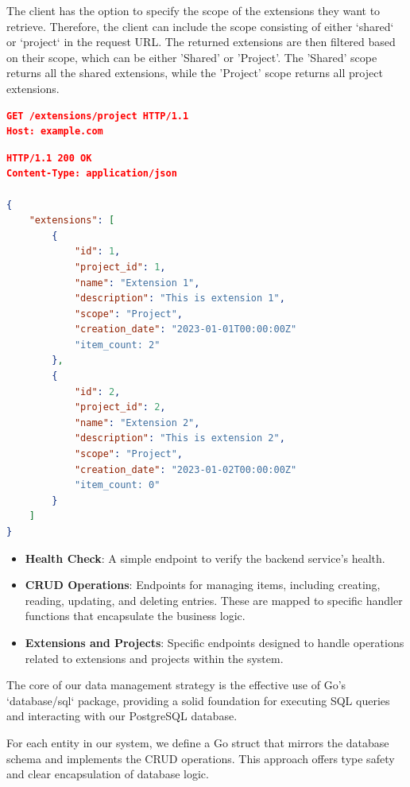 The client has the option to specify the scope of the extensions they want to retrieve.
Therefore, the client can include the scope consisting of either `shared` or `project` in the request URL\@.
The returned extensions are then filtered based on their scope, which can be either 'Shared' or 'Project'.
The 'Shared' scope returns all the shared extensions, while the 'Project' scope returns all project extensions.

\begin{lstlisting}[language=json,label={lst:lstlisting22}]
GET /extensions/project HTTP/1.1
Host: example.com
\end{lstlisting}

\begin{lstlisting}[language=json,label={lst:lstlisting14}]
HTTP/1.1 200 OK
Content-Type: application/json

{
    "extensions": [
        {
            "id": 1,
            "project_id": 1,
            "name": "Extension 1",
            "description": "This is extension 1",
            "scope": "Project",
            "creation_date": "2023-01-01T00:00:00Z"
            "item_count: 2"
        },
        {
            "id": 2,
            "project_id": 2,
            "name": "Extension 2",
            "description": "This is extension 2",
            "scope": "Project",
            "creation_date": "2023-01-02T00:00:00Z"
            "item_count: 0"
        }
    ]
}
\end{lstlisting}

\begin{itemize}
    \item \textbf{Health Check}: A simple endpoint to verify the backend service's health.
    \item \textbf{CRUD Operations}: Endpoints for managing items, including creating, reading, updating, and deleting entries.
    These are mapped to specific handler functions that encapsulate the business logic.
    \item \textbf{Extensions and Projects}: Specific endpoints designed to handle operations related to extensions and projects within the system.
\end{itemize}

The core of our data management strategy is the effective use of Go's `database/sql` package, providing a solid foundation for executing SQL queries and interacting with our PostgreSQL database.

For each entity in our system, we define a Go struct that mirrors the database schema and implements the CRUD operations.
This approach offers type safety and clear encapsulation of database logic.

